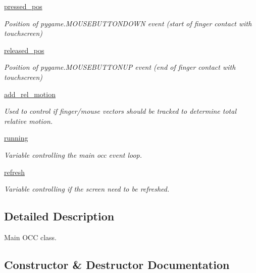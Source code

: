 \begin{DoxyCompactItemize}
\hyperlink{classocc_1_1open__cycling__computer_aa57172c2a04bd0ff61e5dafdefe1554b}{pressed\+\_\+pos}
\begin{DoxyCompactList}\small\item\em Position of pygame.\+M\+O\+U\+S\+E\+B\+U\+T\+T\+O\+N\+D\+O\+WN event (start of finger contact with touchscreen) \end{DoxyCompactList}\item 
\hyperlink{classocc_1_1open__cycling__computer_a430f81b58f8be50077ebaa317d487812}{released\+\_\+pos}
\begin{DoxyCompactList}\small\item\em Position of pygame.\+M\+O\+U\+S\+E\+B\+U\+T\+T\+O\+N\+UP event (end of finger contact with touchscreen) \end{DoxyCompactList}\item 
\hyperlink{classocc_1_1open__cycling__computer_af56c12bbd4cf026b59578e22b922c846}{add\+\_\+rel\+\_\+motion}
\begin{DoxyCompactList}\small\item\em Used to control if finger/mouse vectors should be tracked to determine total relative motion. \end{DoxyCompactList}\item 
\hyperlink{classocc_1_1open__cycling__computer_ace5191a9d73e79fdba4ed1d9a7379274}{running}
\begin{DoxyCompactList}\small\item\em Variable controlling the main occ event loop. \end{DoxyCompactList}\item 
\hyperlink{classocc_1_1open__cycling__computer_a76ee74edfd950f99f8a52ae4fdcc3ac6}{refresh}
\begin{DoxyCompactList}\small\item\em Variable controlling if the screen need to be refreshed. \end{DoxyCompactList}\end{DoxyCompactItemize}


\subsection{Detailed Description}
Main O\+CC class. 

\subsection{Constructor \& Destructor Documentation}
\mbox{\label{classocc_1_1open__cycling__computer_a1824c27f6e2c486c8b50f898db74d077}} 

